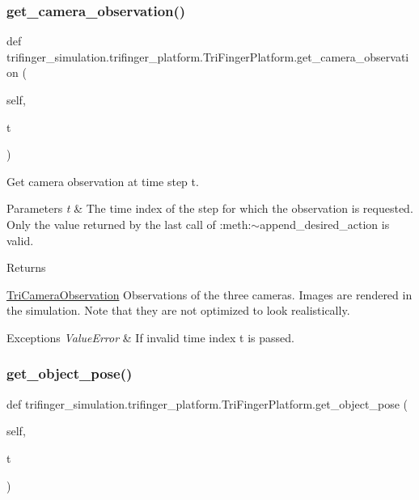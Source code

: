 \subsubsection{\texorpdfstring{get\+\_\+camera\+\_\+observation()}{get\_camera\_observation()}}
{\footnotesize\ttfamily def trifinger\+\_\+simulation.\+trifinger\+\_\+platform.\+Tri\+Finger\+Platform.\+get\+\_\+camera\+\_\+observation (\begin{DoxyParamCaption}\item[{}]{self,  }\item[{}]{t }\end{DoxyParamCaption})}



Get camera observation at time step t. 


\begin{DoxyParams}{Parameters}
{\em t} & The time index of the step for which the observation is requested. Only the value returned by the last call of \+:meth\+:{\ttfamily $\sim$append\+\_\+desired\+\_\+action} is valid.\\
\hline
\end{DoxyParams}
\begin{DoxyReturn}{Returns}


\hyperlink{classtrifinger__simulation_1_1trifinger__platform_1_1TriCameraObservation}{Tri\+Camera\+Observation} Observations of the three cameras. Images are rendered in the simulation. Note that they are not optimized to look realistically.
\end{DoxyReturn}

\begin{DoxyExceptions}{Exceptions}
{\em Value\+Error} & If invalid time index {\ttfamily t} is passed. \\
\hline
\end{DoxyExceptions}
\mbox{\label{classtrifinger__simulation_1_1trifinger__platform_1_1TriFingerPlatform_ad46ed81c3e6c557c9cce2ce919b6110b}} 
\subsubsection{\texorpdfstring{get\+\_\+object\+\_\+pose()}{get\_object\_pose()}}
{\footnotesize\ttfamily def trifinger\+\_\+simulation.\+trifinger\+\_\+platform.\+Tri\+Finger\+Platform.\+get\+\_\+object\+\_\+pose (\begin{DoxyParamCaption}\item[{}]{self,  }\item[{}]{t }\end{DoxyParamCaption})}



